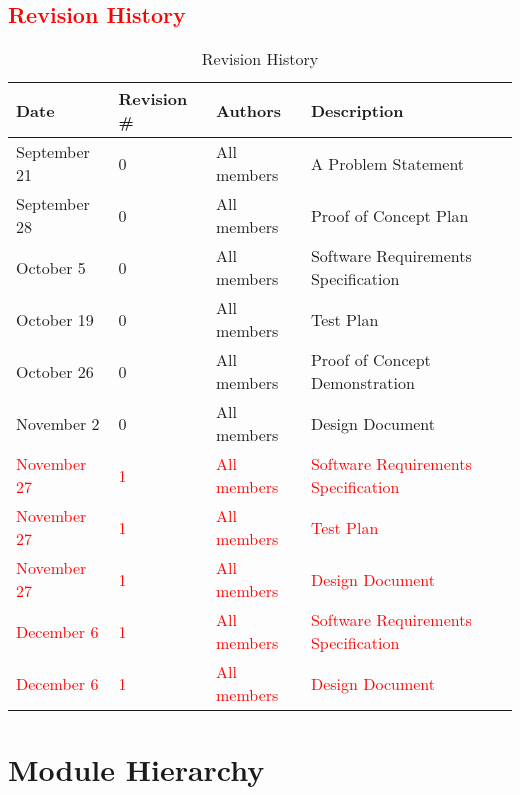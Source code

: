 \documentclass[12pt]{article}
\begin{document}
\subsection{\textcolor{red}{Revision History}}
\begin{table}[H]
\centering
      \caption{Revision History}
        \label{tab:table2}
      \begin{tabular}{ | p{4cm} | p{2cm} | p{4cm} | p{4cm}  | }
        \hline
            \textbf{Date} & \textbf{Revision \#} & \textbf{Authors} & \textbf{Description} \\
        \hline
          September 21 & 0 & All members & A Problem Statement  \\
        \hline
          September 28 & 0 & All members & Proof of Concept Plan \\
        \hline
          October 5 & 0 & All members & Software Requirements Specification \\
        \hline
          October 19 & 0 & All members & Test Plan \\
        \hline
          October 26 & 0 & All members & Proof of Concept Demonstration \\
        \hline
          November 2 & 0 & All members & Design Document \\
        \hline

          \textcolor{red}{ November 27} & \textcolor{red}{1} & \textcolor{red}{All members} & \textcolor{red}{Software Requirements Specification} \\
        \hline
          \textcolor{red}{ November 27} & \textcolor{red}{1} & \textcolor{red}{All members} & \textcolor{red}{Test Plan} \\
        \hline
          \textcolor{red}{ November 27} & \textcolor{red}{1} & \textcolor{red}{All members} & \textcolor{red}{Design Document} \\

        \hline
         \textcolor{red}{ December 6} & \textcolor{red}{1} & \textcolor{red}{All members} & \textcolor{red}{Software Requirements Specification} \\
        \hline
          \textcolor{red}{ December 6} & \textcolor{red}{1} & \textcolor{red}{All members} & \textcolor{red}{Design Document} \\
        \hline

      \end{tabular}
  \end{table}

\section{Module Hierarchy}
\end{document}
